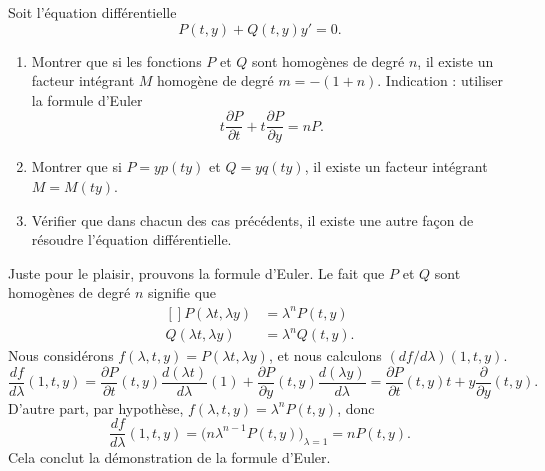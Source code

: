 

\begin{exercice}\label{exo_II-1-12}

Soit l'équation différentielle
\begin{equation}
	P(t,y)+Q(t,y)y'=0.
\end{equation}
\begin{enumerate}
\item
Montrer que si les fonctions $P$ et $Q$ sont homogènes de degré $n$, il existe un facteur intégrant $M$ homogène de degré $m=-(1+n)$. Indication : utiliser la formule d'Euler
\begin{equation}
	t\frac{ \partial P }{ \partial t }+t\frac{ \partial P }{ \partial y }=nP.
\end{equation}

\item
Montrer que si $P=yp(ty)$ et $Q=yq(ty)$, il existe un facteur intégrant $M=M(ty)$.

\item
Vérifier que dans chacun des cas précédents, il existe une autre façon de résoudre l'équation différentielle.

\end{enumerate}

\end{exercice}

Juste pour le plaisir, prouvons la formule d'Euler. Le fait que $P$ et $Q$ sont homogènes de degré $n$ signifie que
\begin{equation}
	\begin{aligned}[]
		P(\lambda t,\lambda y)	&=\lambda^nP(t,y)\\
		Q(\lambda t,\lambda y)	&=\lambda^nQ(t,y).
	\end{aligned}
\end{equation}
Nous considérons $f(\lambda,t,y)=P(\lambda t,\lambda y)$, et nous calculons $(df/d\lambda)(1,t,y)$.
\begin{equation}
	\frac{ df }{ d\lambda }(1,t,y)=\frac{ \partial P }{ \partial t }(t,y)\frac{ d(\lambda t) }{ d\lambda }(1)+\frac{ \partial P }{ \partial y }(t,y)\frac{ d(\lambda y) }{ d\lambda }=\frac{ \partial P }{ \partial t }(t,y)t+y\frac{ \partial  }{ \partial y }(t,y).
\end{equation}
D'autre part, par hypothèse, $f(\lambda,t,y)=\lambda^nP(t,y)$, donc
\begin{equation}
	\frac{ df }{ d\lambda }(1,t,y)=\big( n\lambda^{n-1}P(t,y) \big)_{\lambda=1}=nP(t,y).
\end{equation}
Cela conclut la démonstration de la formule d'Euler.




